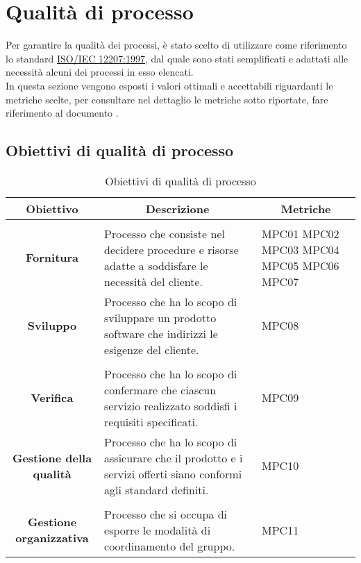 \section{Qualità di processo}\label{section:qualita_processo}
Per garantire la qualità dei processi, è stato scelto di utilizzare come riferimento lo standard 
\href{https://www.math.unipd.it/~tullio/IS-1/2009/Approfondimenti/ISO_12207-1995.pdf}{ISO/IEC 12207:1997}, 
dal quale sono stati semplificati e adattati alle necessità alcuni dei processi in esso elencati.\\
In questa sezione vengono esposti i valori ottimali e accettabili riguardanti le metriche scelte,
per consultare nel dettaglio le metriche sotto riportate, fare riferimento al documento \docNameVersionNdP{}.

\subsection{Obiettivi di qualità di processo}\label{subsection:obiettivi_processo}
\begin{table}[H]
  \centering
  \renewcommand{\arraystretch}{1.8}
  \begin{tabular}{c|p{8cm}|p{2cm}}
    \rowcolor[HTML]{125E28}
    \color[HTML]{FFFFFF}\textbf{Obiettivo}
    & \multicolumn{1}{c}{\color[HTML]{FFFFFF}\textbf{Descrizione}}
    & \multicolumn{1}{c}{\color[HTML]{FFFFFF}\textbf{Metriche}}\\
    \hline
    \rowcolor[HTML]{6BC26B}
    \multicolumn{3}{c}{\textbf{Processi primari}}\\
    \hline
    \textbf{Fornitura} & Processo che consiste nel decidere procedure e risorse adatte a soddisfare le necessità del cliente.  & MPC01 MPC02 MPC03 MPC04 MPC05 MPC06 MPC07\\
    \textbf{Sviluppo} & Processo che ha lo scopo di sviluppare un prodotto software che indirizzi le esigenze del cliente. & MPC08 \\
    \hline
    \rowcolor[HTML]{6BC26B}
    \multicolumn{3}{c}{\textbf{Processi di supporto}}\\
    \hline
    \textbf{Verifica} & Processo che ha lo scopo di confermare che ciascun servizio realizzato soddisfi i requisiti specificati. & MPC09\\
    \textbf{Gestione della qualità} & Processo che ha lo scopo di assicurare che il prodotto e i servizi offerti siano conformi agli standard definiti. & MPC10\\
    \hline
    \rowcolor[HTML]{6BC26B}
    \multicolumn{3}{c}{\textbf{Processi organizzativi}}\\
    \textbf{Gestione organizzativa} & Processo che si occupa di esporre le modalità di coordinamento del gruppo. & MPC11\\
  \end{tabular}
  \caption{Obiettivi di qualità di processo}
\end{table}

